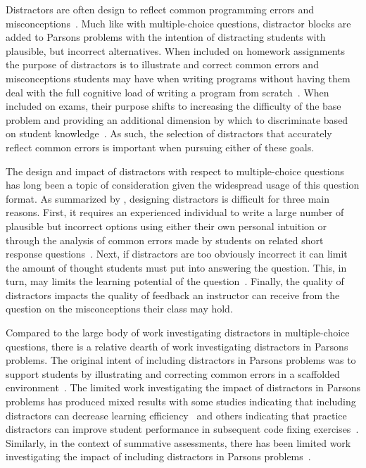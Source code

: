 \documentclass[authorversion,nonacm]{acmart}
\begin{document}
Distractors are often design to reflect common programming errors and
misconceptions~\cite{du2020review, parsons2006parson}.  Much like with
multiple-choice questions, distractor blocks are added to Parsons problems with
the intention of distracting students with plausible, but incorrect
alternatives.  When included on homework assignments the purpose of distractors
is to illustrate and correct common errors and misconceptions students may have
when writing programs without having them deal with the full cognitive load of
writing a program from scratch~\cite{ericson2017solving, haynes2021problem}.
When included on exams, their purpose shifts to increasing the difficulty of the
base problem and providing an additional dimension by which to discriminate
based on student knowledge~\cite{smith2023discovering, smith2023investigating,
smith2023comparing}. As such, the selection of distractors that accurately
reflect common errors is important when pursuing either of these goals. 

The design and impact of distractors with respect to multiple-choice questions
has long been a topic of consideration given the widespread usage of this
question format.  As summarized by \citet{gierl2017developing}, designing
distractors is difficult for three main reasons. First, it requires an
experienced individual to write a large number of plausible but incorrect
options using either their own personal intuition or through the analysis of 
common errors made by students on related short response questions~\cite{briggs2006diagnostic,
halloun1985initial}. Next, if distractors are too obviously incorrect it can
limit the amount of thought students must put into answering the question. This,
in turn, may limits the learning potential of the
question~\cite{little2015optimizing}.  Finally, the quality of distractors
impacts the quality of feedback an instructor can receive from the question on
the misconceptions their class may hold.

Compared to the large body of work investigating distractors in multiple-choice
questions, there is a relative dearth of work investigating distractors in
Parsons problems. The original intent of including distractors in Parsons
problems was to support students by illustrating and correcting common errors
in a scaffolded environment~\cite{parsons2006parson}. The limited work 
investigating the impact of distractors in Parsons problems has produced 
mixed results with some studies indicating that including distractors can
decrease learning efficiency~\cite{harms2016distractors} and others indicating
that practice distractors can improve student performance in subsequent 
code fixing exercises~\cite{ericson2023multi}.  Similarly, in the context of
summative assessments, there has been limited work investigating the impact of
including distractors in Parsons problems~\cite{denny2008evaluating}.
\end{document}
